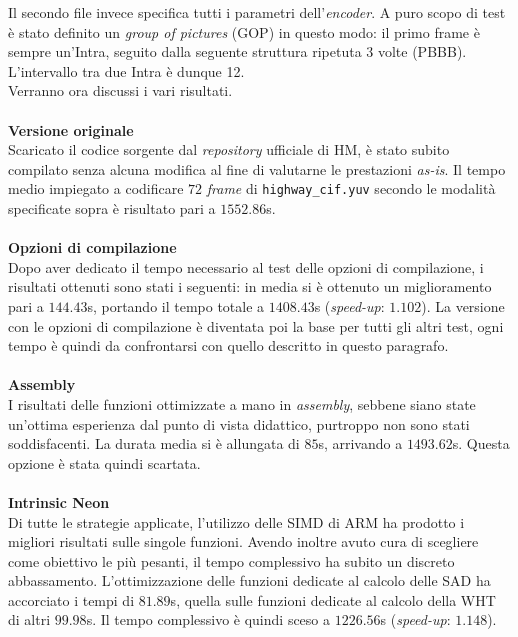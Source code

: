 Il secondo file invece specifica tutti i parametri dell'\emph{encoder}. A puro 
scopo di test è stato definito un \textit{group of pictures} (GOP) in questo 
modo: il primo frame è sempre un'Intra, seguito dalla seguente struttura 
ripetuta 3 volte (PBBB). L'intervallo tra due Intra è dunque 12. \\
Verranno ora discussi i vari risultati. 
\\ \\
\textbf{Versione originale}\\
  Scaricato il codice sorgente dal \emph{repository} ufficiale di HM, è stato 
  subito compilato senza alcuna modifica al fine di valutarne le prestazioni 
  \emph{as-is}. Il tempo medio impiegato a codificare $72$ \emph{frame} di 
  \verb|highway_cif.yuv| secondo le modalità specificate sopra è risultato pari 
  a $1552.86$s.
\\ \\
\textbf{Opzioni di compilazione}\\
  Dopo aver dedicato il tempo necessario al test delle opzioni di compilazione, 
  i risultati ottenuti sono stati i seguenti: in media si è ottenuto un 
  miglioramento pari a $144.43$s, portando il tempo totale a $1408.43$s 
  (\textit{speed-up}: $1.102$).
  La versione con le opzioni di compilazione è diventata poi la base per tutti 
  gli altri test, ogni tempo è quindi da confrontarsi con quello descritto in 
  questo paragrafo.
\\ \\
\textbf{Assembly}\\
  I risultati delle funzioni ottimizzate a mano in \emph{assembly}, sebbene 
  siano state un'ottima esperienza dal punto di vista didattico, purtroppo non 
  sono stati soddisfacenti. 
  La durata media si è allungata di $85$s, arrivando a $1493.62$s. Questa 
  opzione è stata quindi scartata.
\\ \\
\textbf{Intrinsic Neon}\\
  Di tutte le strategie applicate, l'utilizzo delle SIMD di ARM ha prodotto i 
  migliori risultati sulle singole funzioni. Avendo inoltre avuto cura di 
  scegliere come obiettivo le più pesanti, il tempo complessivo ha subito un 
  discreto abbassamento.
  L'ottimizzazione delle funzioni dedicate al calcolo delle SAD ha accorciato i 
  tempi di $81.89$s, quella sulle funzioni dedicate al calcolo della WHT di 
  altri $99.98$s. Il tempo complessivo è quindi sceso a $1226.56$s   
  (\textit{speed-up}: $1.148$).
\\ \\
